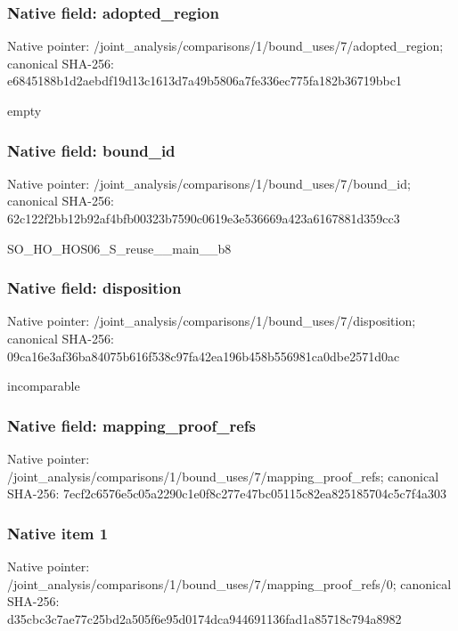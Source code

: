 \documentclass[10pt,a4paper]{article}
\begin{document}
\subsubsection{Native field: adopted\_\allowbreak{}region}
Native pointer: /joint\_\allowbreak{}analysis/comparisons/1/bound\_\allowbreak{}uses/7/adopted\_\allowbreak{}region; canonical SHA-256: e6845188b1d2aebdf19d13c1613d7a49b5806a7fe336ec775fa182b36719bbc1

\begingroup\raggedright\sloppy empty\par\endgroup

\subsubsection{Native field: bound\_\allowbreak{}id}
Native pointer: /joint\_\allowbreak{}analysis/comparisons/1/bound\_\allowbreak{}uses/7/bound\_\allowbreak{}id; canonical SHA-256: 62c122f2bb12b92af4bfb00323b7590c0619e3e536669a423a6167881d359cc3

\begingroup\raggedright\sloppy SO\_\allowbreak{}HO\_\allowbreak{}HOS06\_\allowbreak{}S\_\allowbreak{}reuse\_\allowbreak{}\_\allowbreak{}main\_\allowbreak{}\_\allowbreak{}b8\par\endgroup

\subsubsection{Native field: disposition}
Native pointer: /joint\_\allowbreak{}analysis/comparisons/1/bound\_\allowbreak{}uses/7/disposition; canonical SHA-256: 09ca16e3af36ba84075b616f538c97fa42ea196b458b556981ca0dbe2571d0ac

\begingroup\raggedright\sloppy incomparable\par\endgroup

\subsubsection{Native field: mapping\_\allowbreak{}proof\_\allowbreak{}refs}
Native pointer: /joint\_\allowbreak{}analysis/comparisons/1/bound\_\allowbreak{}uses/7/mapping\_\allowbreak{}proof\_\allowbreak{}refs; canonical SHA-256: 7ecf2c6576e5c05a2290c1e0f8c277e47bc05115c82ea825185704c5c7f4a303

\subsubsection{Native item 1}
Native pointer: /joint\_\allowbreak{}analysis/comparisons/1/bound\_\allowbreak{}uses/7/mapping\_\allowbreak{}proof\_\allowbreak{}refs/0; canonical SHA-256: d35cbc3c7ae77c25bd2a505f6e95d0174dca944691136fad1a85718c794a8982
\end{document}
